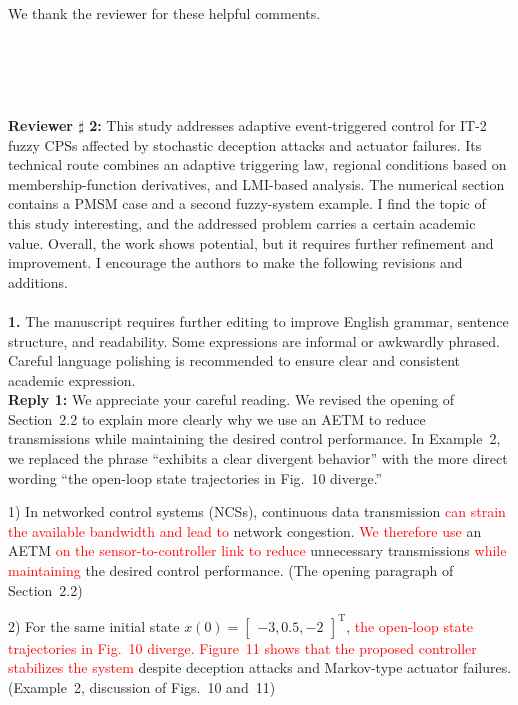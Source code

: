 \documentclass[10pt,fleqn]{article}
\begin{document}
We thank the reviewer for these helpful comments.

~\\
\\
\makebox[\linewidth][l]{*****************************************************************************************}\\
\\
\hspace*{-0.5cm}\indent\textbf{Reviewer $\sharp$ 2:} This study addresses adaptive event-triggered control for IT-2 fuzzy CPSs affected by stochastic deception attacks and actuator failures. Its technical route combines an adaptive triggering law, regional conditions based on membership-function derivatives, and LMI-based analysis. The numerical section contains a PMSM case and a second fuzzy-system example. I find the topic of this study interesting, and the addressed problem carries a certain academic value. Overall, the work shows potential, but it requires further refinement and improvement. I encourage the authors to make the following revisions and additions.
\\
~\\
\textbf{1.} The manuscript requires further editing to improve English grammar, sentence structure, and readability. Some expressions are informal or awkwardly phrased. Careful language polishing is recommended to ensure clear and consistent academic expression.
\\[10pt]
\begingroup
\setlength{\parskip}{6pt}
\indent \textbf{Reply 1:} We appreciate your careful reading. We revised the opening of Section~2.2 to explain more clearly why we use an AETM to reduce transmissions while maintaining the desired control performance. In Example~2, we replaced the phrase ``exhibits a clear divergent behavior'' with the more direct wording ``the open-loop state trajectories in Fig.~10 diverge.''\par
1) In networked control systems (NCSs), continuous data transmission \textcolor{red}{can strain the available bandwidth and lead to} network congestion. \textcolor{red}{We therefore use} an AETM \textcolor{red}{on the sensor-to-controller link to reduce} unnecessary transmissions \textcolor{red}{while maintaining} the desired control performance. (The opening paragraph of Section~2.2)\par
2) For the same initial state $x(0) = \begin{bmatrix} -3, 0.5, -2 \end{bmatrix}^{\mathrm{T}}$, \textcolor{red}{the open-loop state trajectories in Fig.~10 diverge. Figure~11 shows that the proposed controller stabilizes the system} despite deception attacks and Markov-type actuator failures. (Example~2, discussion of Figs.~10 and~11)\par
\endgroup
\end{document}
